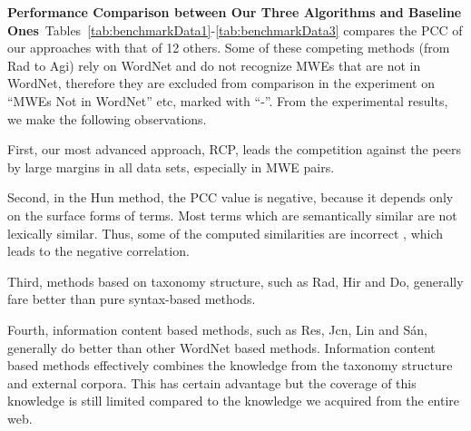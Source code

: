 \noindent\textbf{Performance Comparison between Our Three Algorithms and Baseline Ones}~Tables~\ref{tab:benchmarkData1}-\ref{tab:benchmarkData3} compares the PCC of our approaches with that of 12 others. Some of these competing methods (from Rad to Agi) rely
on WordNet and do not recognize MWEs that are not in WordNet, therefore they are excluded from comparison in the experiment on ``MWEs Not in
WordNet'' etc, marked with ``-''.
From the experimental results, we make the following observations.

First, our most advanced approach, RCP, leads the competition
against the peers by large margins in all data sets,
especially in MWE pairs.

Second, in the Hun method, the PCC value is negative,
because it depends only on the
surface forms of terms. Most terms which are
semantically similar are not lexically similar.
Thus, some of the computed similarities are incorrect , which leads
to the negative correlation.

Third, methods based on taxonomy structure, such as Rad, Hir and Do,
generally fare better than pure syntax-based methods.

Fourth, information content based methods, such as
Res, Jcn, Lin and S\'{a}n, generally do better than other WordNet based
methods.
Information content based methods
effectively combines the knowledge from the taxonomy structure
and external corpora. This has certain advantage but the coverage of
this knowledge is still limited compared to the knowledge we acquired
from the entire web.


